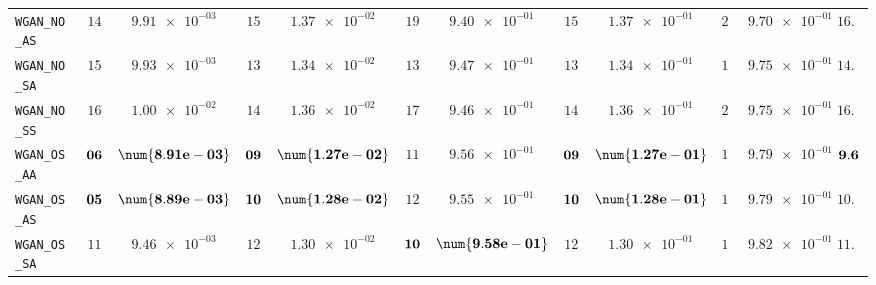 \begin{xltabular}{\textwidth}{l||cC|cC|cC|cC|cC||c}
	\texttt{WGAN\_NO\_AS} & $ 14$ & $ \num{9.91e-03}$ & $ 15$ & $ \num{1.37e-02}$ & $ 19$ & $ \num{9.40e-01}$ & $ 15$ & $ \num{1.37e-01}$ & $ 21$ & $ \num{9.70e-01}$ & $ 16.8$  \\
	\texttt{WGAN\_NO\_SA} & $ 15$ & $ \num{9.93e-03}$ & $ 13$ & $ \num{1.34e-02}$ & $ 13$ & $ \num{9.47e-01}$ & $ 13$ & $ \num{1.34e-01}$ & $ 17$ & $ \num{9.75e-01}$ & $ 14.2$  \\
	\texttt{WGAN\_NO\_SS} & $ 16$ & $ \num{1.00e-02}$ & $ 14$ & $ \num{1.36e-02}$ & $ 17$ & $ \num{9.46e-01}$ & $ 14$ & $ \num{1.36e-01}$ & $ 20$ & $ \num{9.75e-01}$ & $ 16.2$  \\
	\texttt{WGAN\_OS\_AA} & $\bf 06$ & $\bf \num{8.91e-03}$ & $\bf 09$ & $\bf \num{1.27e-02}$ & $ 11$ & $ \num{9.56e-01}$ & $\bf 09$ & $\bf \num{1.27e-01}$ & $ 13$ & $ \num{9.79e-01}$ & $\bf 9.6$  \\
	\texttt{WGAN\_OS\_AS} & $\bf 05$ & $\bf \num{8.89e-03}$ & $\bf 10$ & $\bf \num{1.28e-02}$ & $ 12$ & $ \num{9.55e-01}$ & $\bf 10$ & $\bf \num{1.28e-01}$ & $ 14$ & $ \num{9.79e-01}$ & $ 10.2$  \\
	\texttt{WGAN\_OS\_SA} & $ 11$ & $ \num{9.46e-03}$ & $ 12$ & $ \num{1.30e-02}$ & $\bf 10$ & $\bf \num{9.58e-01}$ & $ 12$ & $ \num{1.30e-01}$ & $ 12$ & $ \num{9.82e-01}$ & $ 11.4$  \\

\end{xltabular}
